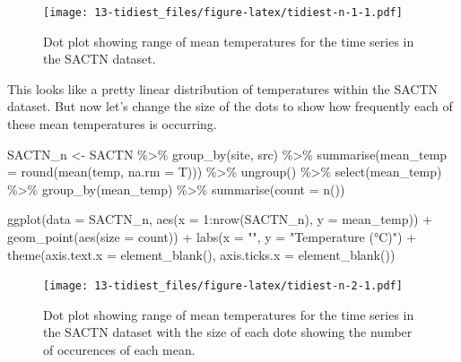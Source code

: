 \documentclass[
]{book}
\newenvironment{Shaded}{\begin{snugshade}}{\end{snugshade}}
\newcommand{\AttributeTok}[1]{\textcolor[rgb]{0.77,0.63,0.00}{#1}}
\newcommand{\DecValTok}[1]{\textcolor[rgb]{0.00,0.00,0.81}{#1}}
\newcommand{\FunctionTok}[1]{\textcolor[rgb]{0.00,0.00,0.00}{#1}}
\newcommand{\NormalTok}[1]{#1}
\newcommand{\OtherTok}[1]{\textcolor[rgb]{0.56,0.35,0.01}{#1}}
\newcommand{\SpecialCharTok}[1]{\textcolor[rgb]{0.00,0.00,0.00}{#1}}
\newcommand{\StringTok}[1]{\textcolor[rgb]{0.31,0.60,0.02}{#1}}
\begin{document}
\begin{figure}
\centering
\texttt{[image: 13-tidiest\_files/figure-latex/tidiest-n-1-1.pdf]}
\caption{\label{fig:tidiest-n-1}Dot plot showing range of mean temperatures for the time series in the SACTN dataset.}
\end{figure}

This looks like a pretty linear distribution of temperatures within the SACTN dataset. But now let's change the size of the dots to show how frequently each of these mean temperatures is occurring.

\begin{Shaded}
\begin{Highlighting}[]
\NormalTok{ SACTN\_n }\OtherTok{\textless{}{-}}\NormalTok{ SACTN }\SpecialCharTok{\%\textgreater{}\%} 
  \FunctionTok{group\_by}\NormalTok{(site, src) }\SpecialCharTok{\%\textgreater{}\%} 
  \FunctionTok{summarise}\NormalTok{(}\AttributeTok{mean\_temp =} \FunctionTok{round}\NormalTok{(}\FunctionTok{mean}\NormalTok{(temp, }\AttributeTok{na.rm =}\NormalTok{ T))) }\SpecialCharTok{\%\textgreater{}\%} 
  \FunctionTok{ungroup}\NormalTok{() }\SpecialCharTok{\%\textgreater{}\%} 
  \FunctionTok{select}\NormalTok{(mean\_temp) }\SpecialCharTok{\%\textgreater{}\%} 
  \FunctionTok{group\_by}\NormalTok{(mean\_temp) }\SpecialCharTok{\%\textgreater{}\%} 
  \FunctionTok{summarise}\NormalTok{(}\AttributeTok{count =} \FunctionTok{n}\NormalTok{())}

\FunctionTok{ggplot}\NormalTok{(}\AttributeTok{data =}\NormalTok{ SACTN\_n, }\FunctionTok{aes}\NormalTok{(}\AttributeTok{x =} \DecValTok{1}\SpecialCharTok{:}\FunctionTok{nrow}\NormalTok{(SACTN\_n), }\AttributeTok{y =}\NormalTok{ mean\_temp)) }\SpecialCharTok{+}
  \FunctionTok{geom\_point}\NormalTok{(}\FunctionTok{aes}\NormalTok{(}\AttributeTok{size =}\NormalTok{ count)) }\SpecialCharTok{+}
  \FunctionTok{labs}\NormalTok{(}\AttributeTok{x =} \StringTok{""}\NormalTok{, }\AttributeTok{y =} \StringTok{"Temperature (°C)"}\NormalTok{) }\SpecialCharTok{+}
  \FunctionTok{theme}\NormalTok{(}\AttributeTok{axis.text.x =} \FunctionTok{element\_blank}\NormalTok{(), }
        \AttributeTok{axis.ticks.x =} \FunctionTok{element\_blank}\NormalTok{())}
\end{Highlighting}
\end{Shaded}

\begin{figure}
\centering
\texttt{[image: 13-tidiest\_files/figure-latex/tidiest-n-2-1.pdf]}
\caption{\label{fig:tidiest-n-2}Dot plot showing range of mean temperatures for the time series in the SACTN dataset with the size of each dote showing the number of occurences of each mean.}
\end{figure}
\end{document}
